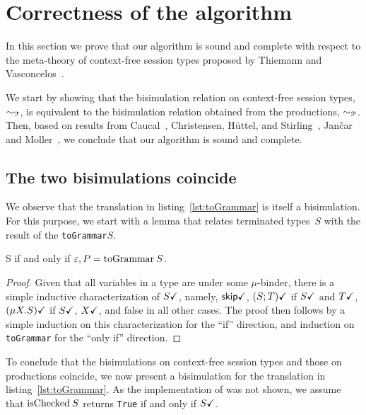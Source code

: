 \section{Correctness of the algorithm}
\label{sec:soundness}

In this section we prove that our algorithm is sound and complete
with respect to the meta-theory of context-free session types proposed
by Thiemann and Vasconcelos~\cite{thiemann2016context}.

We start by showing that the bisimulation relation on context-free
session types, $\sim_\mathcal T$, is equivalent to the bisimulation
relation obtained from the productions, $\sim_\mathcal P$.  Then, based on
results from Caucal~\cite{caucal1986decidabilite}, Christensen,
H{\"{u}}ttel, and Stirling~\cite{DBLP:journals/iandc/ChristensenHS95},
Jan{\v{c}}ar and Moller~\cite{janvcar1999techniques}, we conclude that
our algorithm is sound and complete.

\subsection{The two bisimulations coincide}

We observe that the translation in listing~\ref{lst:toGrammar} is itself
a bisimulation.
%
For this purpose, we start with a lemma that relates terminated types~$S$ 
with the result of the \lstinline|toGrammar|$S$.

\begin{lemma}
  \label{lem:terminated-togrammar}
  \DONE S if and only if $\varepsilon, P = \toGrammarf S$.
\end{lemma}

\begin{proof} Given that all variables in a type are under some
  $\mu$-binder, there is a simple inductive characterization of
  $S\checkmark$, namely, $\mathsf{skip}\checkmark$, $(S;T)\checkmark$ if $S\checkmark$ and
  $T\checkmark$, $(\mu X.S)\checkmark$ if $S\checkmark$, $X\checkmark$, and false in
  all other cases. The proof then follows by a simple induction on
  this characterization for the ``if'' direction, and induction on
  \lstinline|toGrammar| for the ``only if'' direction.
\end{proof}

To conclude that the bisimulations on context-free session types and
those on productions coincide, we now present a bisimulation
for the translation in listing~\ref{lst:toGrammar}.
%
As the implementation of \isCheckedf was not shown, we assume that
$\isCheckedf S$ returns
\lstinline|True| if and only if $S\checkmark$.

